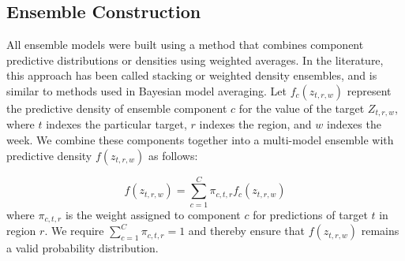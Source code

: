 \documentclass{article}\usepackage[]{graphicx}\usepackage[]{color}
\begin{document}
\subsection{Ensemble Construction} \label{sec:stacking}

All ensemble models were built using a method that combines component predictive distributions or densities using weighted averages. In the literature, this approach has been called stacking\cite{Wolpert1992} or weighted density ensembles\cite{Ray2018}, and is similar to methods used in Bayesian model averaging\cite{Raftery2005}. Let $f_c(z_{t,r,w})$ represent the predictive density of ensemble component $c$ for the value of the target $Z_{t,r,w}$, where $t$ indexes the particular target, $r$ indexes the region, and $w$ indexes the week. We combine these components together into a multi-model ensemble with predictive density $f(z_{t,r,w})$ as follows:

\begin{equation}
f(z_{t,r,w})  = \sum^C_{c = 1} \pi_{c,t,r} f_c(z_{t,r,w})
\label{eq:enseq}
\end{equation}
where $\pi_{c, t, r}$ is the weight assigned to component $c$ for predictions of target $t$ in region $r$. We require $\sum^C_{c = 1} \pi_{c,t,r} = 1$ and thereby ensure that $f(z_{t,r,w})$ remains a valid probability distribution. 
\end{document}
